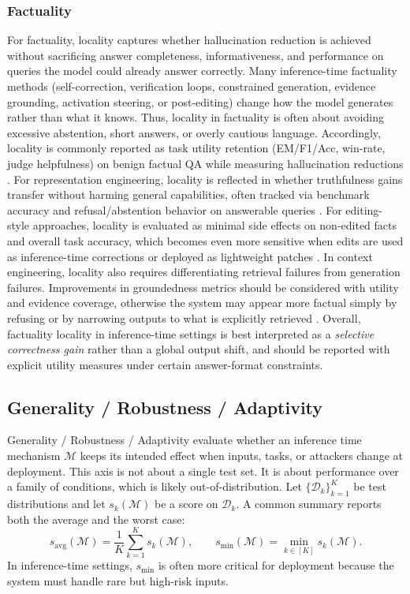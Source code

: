 \subsubsection{Factuality}
For factuality, locality captures whether hallucination reduction is achieved without sacrificing answer completeness, informativeness, and performance on queries the model could already answer correctly. Many inference-time factuality methods (self-correction, verification loops, constrained generation, evidence grounding, activation steering, or post-editing) change how the model generates rather than what it knows. Thus, locality in factuality is often about avoiding excessive abstention, short answers, or overly cautious language. Accordingly, locality is commonly reported as task utility retention (EM/F1/Acc, win-rate, judge helpfulness) on benign factual QA while measuring hallucination reductions \citep{dhuliawala2024chain, li2024think, feng2024teaching, Park2024ConVisCD, Yuan2024HELPDMH, Suo2025OctopusAH}. For representation engineering, locality is reflected in whether truthfulness gains transfer without harming general capabilities, often tracked via benchmark accuracy and refusal/abstention behavior on answerable queries \citep{li2023iti, bayat2024enhanced, wang2024act, liu2024uth, li2025truthneurons}. For editing-style approaches, locality is evaluated as minimal side effects on non-edited facts and overall task accuracy, which becomes even more sensitive when edits are used as inference-time corrections or deployed as lightweight patches \citep{meng2022locating, meng2022memit, hartvigsen2024aging, wang2024wise}. In context engineering, locality also requires differentiating retrieval failures from generation failures. Improvements in groundedness metrics should be considered with utility and evidence coverage, otherwise the system may appear more factual simply by refusing or by narrowing outputs to what is explicitly retrieved \citep{asai2024self, zhou2024metacognitive}. Overall, factuality locality in inference-time settings is best interpreted as a \emph{selective correctness gain} rather than a global output shift, and should be reported with explicit utility measures under certain answer-format constraints.



\subsection{Generality / Robustness / Adaptivity}
Generality / Robustness / Adaptivity evaluate whether an inference time mechanism $\mathcal{M}$ keeps its intended effect when inputs, tasks, or attackers change at deployment. This axis is not about a single test set. It is about performance over a family of conditions, which is likely out-of-distribution. Let $\{\mathcal{D}_k\}_{k=1}^K$ be test distributions and let $s_k(\mathcal{M})$ be a score on $\mathcal{D}_k$. A common summary reports both the average and the worst case:
\[
s_{\mathrm{avg}}(\mathcal{M})=\frac{1}{K}\sum_{k=1}^K s_k(\mathcal{M}),
\qquad
s_{\min}(\mathcal{M})=\min_{k\in[K]} s_k(\mathcal{M}).
\]
In inference-time settings, $s_{\min}$ is often more critical for deployment because the system must handle rare but high-risk inputs.

